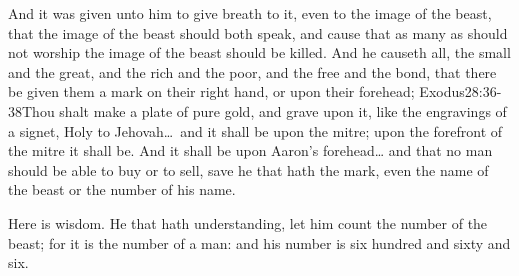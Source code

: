 And it was given unto him to give breath to it, even to the image of the beast, that the image of the beast should both speak, and cause that as many as should not worship the image of the beast should be killed.%
And he causeth all, the small and the great, and the rich and the poor, and the free and the bond, that there be given them a mark on their right hand, or upon their forehead;%
				  {Exodus}{28:36-38}{Thou shalt make a plate of pure gold, and grave upon it, like the engravings of a signet, Holy to Jehovah\ldots\ and it shall be upon the mitre; upon the forefront of the mitre it shall be. And it shall be upon Aaron’s forehead\ldots} %
and that no man should be able to buy or to sell, save he that hath the mark, even the name of the beast or the number of his name. 

Here is wisdom. He that hath understanding, let him count the number of the beast; for it is the number of a man: and his number is six hundred and sixty and six.

